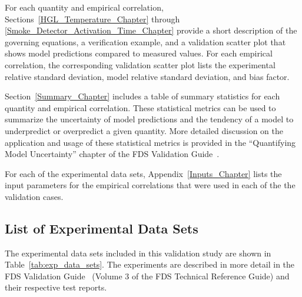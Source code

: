 For each quantity and empirical correlation, Sections~\ref{HGL_Temperature_Chapter} through \ref{Smoke_Detector_Activation_Time_Chapter} provide a short description of the governing equations, a verification example, and a validation scatter plot that shows model predictions compared to measured values. For each empirical correlation, the corresponding validation scatter plot lists the experimental relative standard deviation, model relative standard deviation, and bias factor.

Section~\ref{Summary_Chapter} includes a table of summary statistics for each quantity and empirical correlation. These statistical metrics can be used to summarize the uncertainty of model predictions and the tendency of a model to underpredict or overpredict a given quantity. More detailed discussion on the application and usage of these statistical metrics is provided in the ``Quantifying Model Uncertainty'' chapter of the FDS Validation Guide~\cite{FDS_Validation_Guide}.

For each of the experimental data sets, Appendix~\ref{Inputs_Chapter} lists the input parameters for the empirical correlations that were used in each of the the validation cases.

\subsection*{List of Experimental Data Sets}

The experimental data sets included in this validation study are shown in Table~\ref{tab:exp_data_sets}. The experiments are described in more detail in the FDS Validation Guide~\cite{FDS_Validation_Guide} (Volume 3 of the FDS Technical Reference Guide) and their respective test reports.

